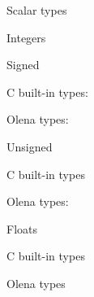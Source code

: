 \begin{list}{--}{}
\item Scalar types
  \begin{list}{--}{}
  \item Integers
    \begin{list}{--}{}
    \item Signed
      \begin{list}{--}{}
      \item C built-in types:
	\begin{list}{--}{}
	\item {}
	\item {}
	\item {}
	\item {}
	\end{list}
      \item Olena types: 
      \end{list}
    \item Unsigned
      \begin{list}{--}{}
      \item C built-in types
	\begin{list}{--}{}
	\item {}
	\item {}
	\item {}
	\item {}
	\end{list}
      \item Olena types: 
      \end{list}
    \end{list}
  \item Floats
    \begin{list}{--}{}
    \item C built-in types
      \begin{list}{--}{}
	\item {}
	\item {}
      \end{list}
    \item Olena types
      \begin{list}{--}{}
	\item {}
	\item {}
      \end{list}
    \end{list}
  \end{list}

\end{list}
